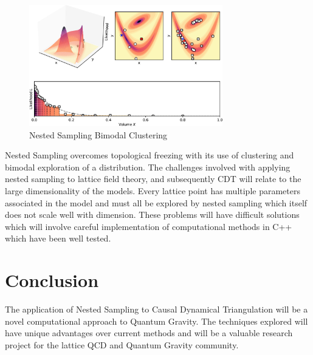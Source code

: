 \documentclass[draft]{article}
\begin{document}
\begin{figure}[H]
\centering
\includegraphics[width=0.75\textwidth]{ns.png}
\caption{Nested Sampling Bimodal Clustering}
\end{figure}

Nested Sampling overcomes topological freezing with its use of clustering and bimodal exploration of a distribution. The challenges involved with applying nested sampling to lattice field theory, and subsequently CDT will relate to the large dimensionality of the models. Every lattice point has multiple parameters associated in the model and must all be explored by nested sampling which itself does not scale well with dimension. These problems will have difficult solutions which will involve careful implementation of computational methods in C++ which have been well tested.

\section{Conclusion}
The application of Nested Sampling to Causal Dynamical Triangulation will be a novel computational approach to Quantum Gravity. The techniques explored will have unique advantages over current methods and will be a valuable research project for the lattice QCD and Quantum Gravity community.
\end{document}
